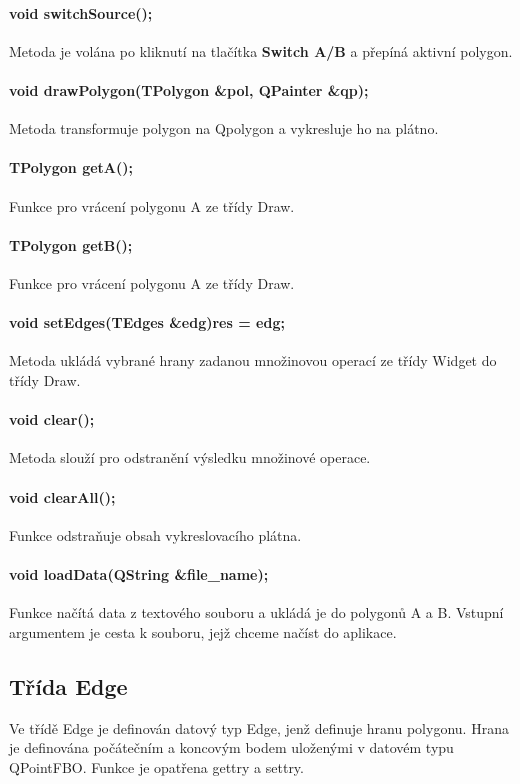 \documentclass[11pt]{article}
\begin{document}
\paragraph{void switchSource();}
Metoda je volána po kliknutí na tlačítka \textbf{Switch A/B} a přepíná aktivní polygon.

\paragraph{void drawPolygon(TPolygon \&pol, QPainter \&qp);}
Metoda transformuje polygon na Qpolygon a vykresluje ho na plátno.

\paragraph{TPolygon getA();}
Funkce pro vrácení polygonu A ze třídy Draw.

\paragraph{TPolygon getB();}
Funkce pro vrácení polygonu A ze třídy Draw.

\paragraph{void setEdges(TEdges \&edg){res = edg;}}
Metoda ukládá vybrané hrany zadanou množinovou operací ze třídy Widget do třídy Draw.

\paragraph{void clear();}
Metoda slouží pro odstranění výsledku množinové operace.

\paragraph{void clearAll();}
Funkce odstraňuje obsah vykreslovacího plátna.

\paragraph{void loadData(QString \&file\_name);}
Funkce načítá data z textového souboru a ukládá je do polygonů A a B. Vstupní argumentem je cesta k souboru, jejž chceme načíst do aplikace. 

\subsection{Třída Edge}
Ve třídě Edge je definován datový typ Edge, jenž definuje hranu polygonu. Hrana je definována počátečním a koncovým bodem uloženými v datovém typu QPointFBO. Funkce je opatřena gettry a settry.
\end{document}
